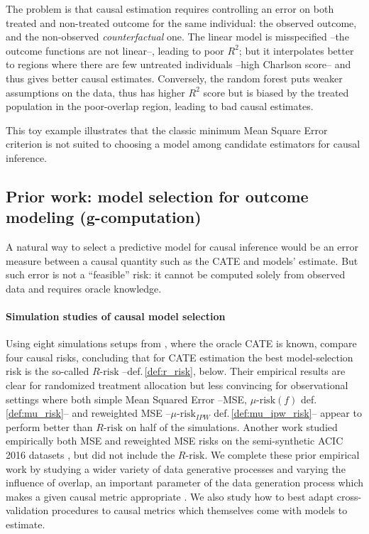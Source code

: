 \documentclass{report}
\begin{document}
The problem is that causal estimation requires controlling
an error on both treated and non-treated outcome for the same individual:
the observed outcome, and the non-observed \emph{counterfactual} one.
The linear model is misspecified --the outcome functions are not
linear--, leading to poor $R^2$; but it interpolates better to regions
where there are few untreated individuals --high Charlson score-- and
thus gives better causal estimates. Conversely, the random forest puts
weaker assumptions on the data, thus has higher $R^2$ score but is biased
by the treated population in the poor-overlap region, leading
to bad causal estimates.

This toy example illustrates that the classic minimum Mean Square Error
criterion is not suited to choosing a model among candidate
estimators for causal inference.

\subsection{Prior work: model selection for outcome modeling (g-computation)}\label{subsec:causal_model_selection:prior_work}%


A natural way to select a predictive model for causal inference would be
an error measure between a causal quantity such as the CATE and models' estimate. But such error is
not a ``feasible'' risk: it cannot be computed solely from observed data
and requires oracle knowledge.


\paragraph{Simulation studies of causal model selection}

Using eight simulations setups from \cite{powers_methods_2018}, where
the oracle CATE is known, \citet{schuler_comparison_2018} compare four
causal risks, concluding that for CATE estimation the best
model-selection risk is the so-called $R\text{-risk}$
\citep{nie_quasioracle_2017} --def.\,\ref{def:r_risk}, below. Their
empirical results are clear for randomized treatment allocation but less
convincing for observational settings where both simple Mean Squared
Error --MSE, $\mu\text{-risk}(f)$ def.\,\ref{def:mu_risk}-- and
reweighted MSE --$\mu\text{-risk}_{IPW}$ def.\,\ref{def:mu_ipw_risk}--
appear to perform better than $R\text{-risk}$ on half of the simulations.
Another work \citep{alaa_validating_2019} studied empirically both MSE and
reweighted MSE risks on the semi-synthetic ACIC 2016 datasets
\citep{dorie_automated_2019}, but did not include the $R\text{-risk}$. We complete these
prior empirical work by studying a wider variety of data generative
processes and varying the influence of overlap, an important parameter of
the data generation process which makes a given causal metric appropriate
\citep{damour_overlap_2020}. We also study how to best adapt
cross-validation procedures to causal metrics which themselves come with
models to estimate.
\end{document}
